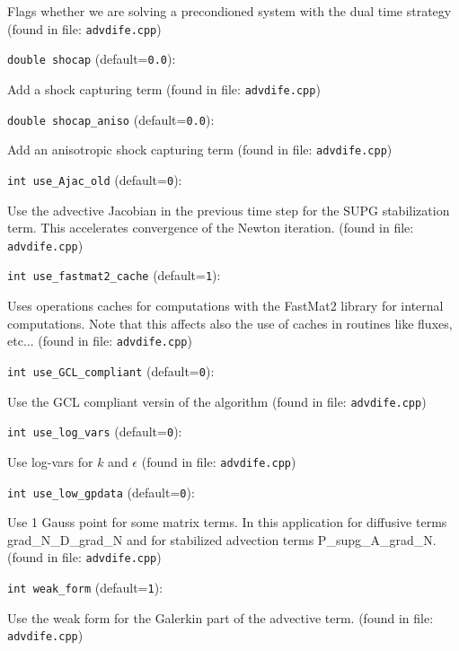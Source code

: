 Flags whether we are solving a precondioned
system with the dual time strategy
 (found in file: \verb+advdife.cpp+)
\item\verb+double shocap+ {\rm(default=\verb|0.0|)}:

Add a shock capturing term
 (found in file: \verb+advdife.cpp+)
\item\verb+double shocap_aniso+ {\rm(default=\verb|0.0|)}:

Add an anisotropic shock capturing term
 (found in file: \verb+advdife.cpp+)
\item\verb+int use_Ajac_old+ {\rm(default=\verb|0|)}:

Use the advective Jacobian in the previous time step
 for the SUPG stabilization term. This accelerates
 convergence of the Newton iteration.
 (found in file: \verb+advdife.cpp+)
\item\verb+int use_fastmat2_cache+ {\rm(default=\verb|1|)}:

Uses operations caches for computations with the FastMat2
 library for internal computations. Note that this affects also the
 use of caches in routines like fluxes, etc...
 (found in file: \verb+advdife.cpp+)
\item\verb+int use_GCL_compliant+ {\rm(default=\verb|0|)}:

Use the GCL compliant versin of the algorithm 
 (found in file: \verb+advdife.cpp+)
\item\verb+int use_log_vars+ {\rm(default=\verb|0|)}:

Use log-vars for $k$ and $\epsilon$
 (found in file: \verb+advdife.cpp+)
\item\verb+int use_low_gpdata+ {\rm(default=\verb|0|)}:

Use 1 Gauss point for some matrix terms.
In this application for diffusive terms grad_N_D_grad_N
and for stabilized advection terms P_supg_A_grad_N.
 (found in file: \verb+advdife.cpp+)
\item\verb+int weak_form+ {\rm(default=\verb|1|)}:

Use the weak form for the Galerkin part of the advective term.
 (found in file: \verb+advdife.cpp+)
